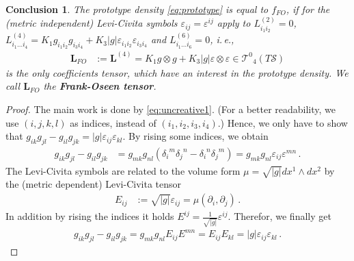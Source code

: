 \documentclass{scrartcl}
\newcommand{\ie}{i.\,e.}%
\newcommand{\formPeriod}{\,\text{.}}
\newcommand{\Lb}{\mathbf{L}}%
\newcommand{\surf}{\mathcal{S}}
\newcommand{\sftensor}[3]{{{#1}^{#2}}_{#3}}
\newcommand{\fstensor}[3]{{{#1}_{#2}}^{#3}}
\newtheorem{conclusion}{Conclusion}
\begin{document}
      \begin{conclusion}\label{concl:frankoseentensors}
        The prototype density \eqref{eq:prototype} is equal to \( f_{FO} \), if 
        for the (metric independent) Levi-Civita symbols \( \varepsilon_{ij}=\varepsilon^{ij} \) apply to 
        \( L^{(2)}_{i_{1}i_{2}} = 0 \), 
        \( L^{(4)}_{i_{1}\ldots i_{4}} = K_{1}g_{i_{1}i_{2}}g_{i_{3}i_{4}} + K_{3}|g|\varepsilon_{i_{1}i_{2}}\varepsilon_{i_{3}i_{4}} \)
        and \( L^{(6)}_{i_{1}\ldots i_{6}} = 0 \),
        \ie, 
        \begin{align}
          \Lb_{FO}&:= \Lb^{(4)} = K_{1} g \otimes g + K_{3}|g| \varepsilon \otimes \varepsilon \in \sftensor{\mathcal{T}}{0}{4}(T\surf)
        \end{align}
        is the only coefficients tensor, which have an interest in the prototype density.
        We call \( \Lb_{FO} \) the \textbf{Frank-Oseen tensor}.
      \end{conclusion}
      \begin{proof}
        The main work is done by \eqref{eq:uncreative1}.
        (For a better readability, we use \( (i,j,k,l) \) as indices, instead of \( (i_{1},i_{2},i_{3},i_{4})\).)
        Hence, we only have to show that
        \( g_{ik}g_{jl} - g_{il}g_{jk} = |g|\varepsilon_{ij}\varepsilon_{kl} \).        
        By rising some indices, we obtain
        \begin{align}
          g_{ik}g_{jl} - g_{il}g_{jk}
              &= g_{mk}g_{nl}\left( \fstensor{\delta}{i}{m}\fstensor{\delta}{j}{n}
                                   -\fstensor{\delta}{i}{n}\fstensor{\delta}{j}{m}\right) 
              =  g_{mk}g_{nl}\varepsilon_{ij}\varepsilon^{mn}\formPeriod
        \end{align}
        The Levi-Civita symbols are related to the volume form \( \mu=\sqrt{|g|}dx^{1}\wedge dx^{2} \)
        by the (metric dependent) Levi-Civita tensor
        \begin{align}
          E_{ij} &:= \sqrt{|g|} \varepsilon_{ij} = \mu(\partial_{i},\partial_{j})\formPeriod
        \end{align}
        In addition by rising the indices it holds \(  E^{ij} = \frac{1}{\sqrt{|g|}} \varepsilon^{ij} \).
        Therefor, we finally get
        \begin{align}
          g_{ik}g_{jl} - g_{il}g_{jk}
            = g_{mk}g_{nl}E_{ij}E^{mn}
            = E_{ij}E_{kl} = |g| \varepsilon_{ij}\varepsilon_{kl} \formPeriod
        \end{align}
      \end{proof}
\end{document}
